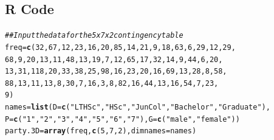 \documentclass{article}\usepackage[]{graphicx}\usepackage[svgnames]{xcolor}
\makeatletter
\newcommand{\hlnum}[1]{\textcolor[rgb]{0.686,0.059,0.569}{#1}}%
\newcommand{\hlstr}[1]{\textcolor[rgb]{0.192,0.494,0.8}{#1}}%
\newcommand{\hlcom}[1]{\textcolor[rgb]{0.678,0.584,0.686}{\textit{#1}}}%
\newcommand{\hlstd}[1]{\textcolor[rgb]{0.345,0.345,0.345}{#1}}%
\newcommand{\hlkwb}[1]{\textcolor[rgb]{0.69,0.353,0.396}{#1}}%
\newcommand{\hlkwc}[1]{\textcolor[rgb]{0.333,0.667,0.333}{#1}}%
\newcommand{\hlkwd}[1]{\textcolor[rgb]{0.737,0.353,0.396}{\textbf{#1}}}%
\newenvironment{kframe}{%
 \def\at@end@of@kframe{}%
 \ifinner\ifhmode%
  \def\at@end@of@kframe{\end{minipage}}%
  \begin{minipage}{\columnwidth}%
 \fi\fi%
 \def\FrameCommand##1{\hskip\@totalleftmargin \hskip-\fboxsep
 \colorbox{shadecolor}{##1}\hskip-\fboxsep
     \hskip-\linewidth \hskip-\@totalleftmargin \hskip\columnwidth}%
 \MakeFramed {\advance\hsize-\width
   \@totalleftmargin\z@ \linewidth\hsize
   \@setminipage}}%
 {\par\unskip\endMakeFramed%
 \at@end@of@kframe}
\newenvironment{knitrout}{}{} %
\makeatother
\begin{document}
\subsection*{R Code}
\begin{knitrout}
\color{fgcolor}\begin{kframe}
\begin{alltt}
\hlcom{## Input the data for the 5 x 7 x 2 contingency table}
\hlstd{freq} \hlkwb{=} \hlkwd{c}\hlstd{(}\hlnum{32}\hlstd{,} \hlnum{67}\hlstd{,} \hlnum{12}\hlstd{,} \hlnum{23}\hlstd{,} \hlnum{16}\hlstd{,} \hlnum{20}\hlstd{,} \hlnum{85}\hlstd{,} \hlnum{14}\hlstd{,} \hlnum{21}\hlstd{,} \hlnum{9}\hlstd{,} \hlnum{18}\hlstd{,} \hlnum{63}\hlstd{,} \hlnum{6}\hlstd{,} \hlnum{29}\hlstd{,} \hlnum{12}\hlstd{,} \hlnum{29}\hlstd{,}
  \hlnum{68}\hlstd{,} \hlnum{9}\hlstd{,} \hlnum{20}\hlstd{,} \hlnum{13}\hlstd{,} \hlnum{11}\hlstd{,} \hlnum{48}\hlstd{,} \hlnum{13}\hlstd{,} \hlnum{19}\hlstd{,} \hlnum{7}\hlstd{,} \hlnum{12}\hlstd{,} \hlnum{65}\hlstd{,} \hlnum{17}\hlstd{,} \hlnum{32}\hlstd{,} \hlnum{14}\hlstd{,} \hlnum{9}\hlstd{,} \hlnum{44}\hlstd{,} \hlnum{6}\hlstd{,} \hlnum{20}\hlstd{,}
  \hlnum{13}\hlstd{,} \hlnum{31}\hlstd{,} \hlnum{118}\hlstd{,} \hlnum{20}\hlstd{,} \hlnum{33}\hlstd{,} \hlnum{38}\hlstd{,} \hlnum{25}\hlstd{,} \hlnum{98}\hlstd{,} \hlnum{16}\hlstd{,} \hlnum{23}\hlstd{,} \hlnum{20}\hlstd{,} \hlnum{16}\hlstd{,} \hlnum{69}\hlstd{,} \hlnum{13}\hlstd{,} \hlnum{28}\hlstd{,} \hlnum{8}\hlstd{,} \hlnum{58}\hlstd{,}
  \hlnum{88}\hlstd{,} \hlnum{13}\hlstd{,} \hlnum{11}\hlstd{,} \hlnum{13}\hlstd{,} \hlnum{8}\hlstd{,} \hlnum{30}\hlstd{,} \hlnum{7}\hlstd{,} \hlnum{16}\hlstd{,} \hlnum{3}\hlstd{,} \hlnum{8}\hlstd{,} \hlnum{82}\hlstd{,} \hlnum{16}\hlstd{,} \hlnum{44}\hlstd{,} \hlnum{13}\hlstd{,} \hlnum{16}\hlstd{,} \hlnum{54}\hlstd{,} \hlnum{7}\hlstd{,} \hlnum{23}\hlstd{,}
  \hlnum{9}\hlstd{)}
\hlstd{names} \hlkwb{=} \hlkwd{list}\hlstd{(}\hlkwc{D} \hlstd{=} \hlkwd{c}\hlstd{(}\hlstr{"LT HSc"}\hlstd{,} \hlstr{"HSc"}\hlstd{,} \hlstr{"JunCol"}\hlstd{,} \hlstr{"Bachelor"}\hlstd{,} \hlstr{"Graduate"}\hlstd{),}
  \hlkwc{P} \hlstd{=} \hlkwd{c}\hlstd{(}\hlstr{"1"}\hlstd{,} \hlstr{"2"}\hlstd{,} \hlstr{"3"}\hlstd{,} \hlstr{"4"}\hlstd{,} \hlstr{"5"}\hlstd{,} \hlstr{"6"}\hlstd{,} \hlstr{"7"}\hlstd{),} \hlkwc{G} \hlstd{=} \hlkwd{c}\hlstd{(}\hlstr{"male"}\hlstd{,} \hlstr{"female"}\hlstd{))}
\hlstd{party.3D} \hlkwb{=} \hlkwd{array}\hlstd{(freq,} \hlkwd{c}\hlstd{(}\hlnum{5}\hlstd{,} \hlnum{7}\hlstd{,} \hlnum{2}\hlstd{),} \hlkwc{dimnames} \hlstd{= names)}

\end{alltt}
\end{kframe}
\end{knitrout}
\end{document}
